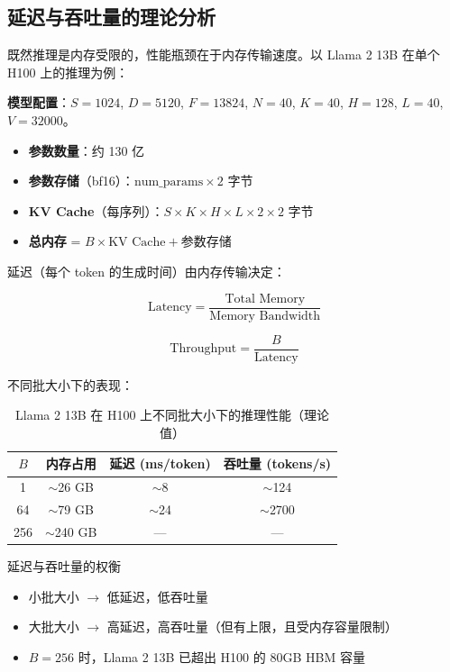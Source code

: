 \documentclass[a4paper]{article}
\begin{document}
\subsection{延迟与吞吐量的理论分析}

既然推理是内存受限的，性能瓶颈在于内存传输速度。以 Llama 2 13B 在单个 H100 上的推理为例：

\textbf{模型配置}：$S=1024$, $D=5120$, $F=13824$, $N=40$, $K=40$, $H=128$, $L=40$, $V=32000$。

\begin{itemize}
    \item \textbf{参数数量}：约 130 亿
    \item \textbf{参数存储}（bf16）：$\text{num\_params} \times 2$ 字节
    \item \textbf{KV Cache}（每序列）：$S \times K \times H \times L \times 2 \times 2$ 字节
    \item \textbf{总内存} = $B \times \text{KV Cache} + \text{参数存储}$
\end{itemize}

延迟（每个 token 的生成时间）由内存传输决定：

$$\text{Latency} = \frac{\text{Total Memory}}{\text{Memory Bandwidth}}$$

$$\text{Throughput} = \frac{B}{\text{Latency}}$$

不同批大小下的表现：

\begin{table}[H]
\centering
\begin{tabular}{cccc}
\toprule
$B$ & 内存占用 & 延迟 (ms/token) & 吞吐量 (tokens/s) \\
\midrule
1 & $\sim$26 GB & $\sim$8 & $\sim$124 \\
64 & $\sim$79 GB & $\sim$24 & $\sim$2700 \\
256 & $\sim$240 GB & --- & --- \\
\bottomrule
\end{tabular}
\caption{Llama 2 13B 在 H100 上不同批大小下的推理性能（理论值）}
\end{table}

\begin{importantbox}{延迟与吞吐量的权衡}
\begin{itemize}
    \item 小批大小 $\rightarrow$ 低延迟，低吞吐量
    \item 大批大小 $\rightarrow$ 高延迟，高吞吐量（但有上限，且受内存容量限制）
    \item $B=256$ 时，Llama 2 13B 已超出 H100 的 80GB HBM 容量
\end{itemize}
\end{importantbox}
\end{document}
